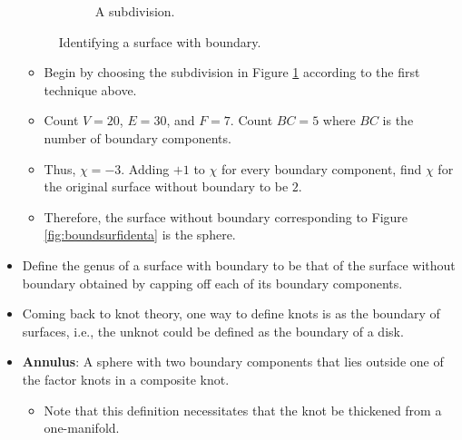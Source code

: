 \documentclass[titlepage]{article}
\numberwithin{figure}{section}
\numberwithin{table}{section}
\numberwithin{equation}{section}
\begin{document}
\begin{itemize}
\begin{figure}[h!]
\begin{subfigure}[b]{0.3\linewidth}
            \caption{A subdivision.}
            \label{fig:boundsurfidentb}
        \end{subfigure}
        \caption{Identifying a surface with boundary.}
        \label{fig:boundsurfident}
    \end{figure}
    \begin{itemize}
        \item Begin by choosing the subdivision in Figure \ref{fig:boundsurfidentb} according to the first technique above.
        \item Count $V=20$, $E=30$, and $F=7$. Count $BC=5$ where $BC$ is the number of boundary components.
        \item Thus, $\chi=-3$. Adding $+1$ to $\chi$ for every boundary component, find $\chi$ for the original surface without boundary to be $2$.
        \item Therefore, the surface without boundary corresponding to Figure \ref{fig:boundsurfidenta} is the sphere.
    \end{itemize}
    \item Define the genus of a surface with boundary to be that of the surface without boundary obtained by capping off each of its boundary components.
    \item Coming back to knot theory, one way to define knots is as the boundary of surfaces, i.e., the unknot could be defined as the boundary of a disk.
    \item \textbf{Annulus}: A sphere with two boundary components that lies outside one of the factor knots in a composite knot.
    \begin{itemize}
        \item Note that this definition necessitates that the knot be thickened from a one-manifold.

\end{itemize}
\end{itemize}
\end{document}
